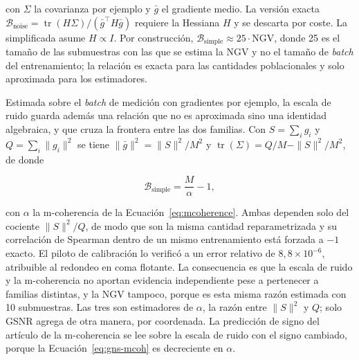 con $\Sigma$ la covarianza por ejemplo y $\bar{g}$ el gradiente medio. La versión exacta $\mathcal{B}_{\text{noise}} = \operatorname{tr}(H\Sigma)/(\bar{g}^\top H \bar{g})$ requiere la Hessiana $H$ y se descarta por coste. La simplificada asume $H \propto I$. Por construcción, $\mathcal{B}_{\text{simple}} \approx 25 \cdot \mathrm{NGV}$, donde 25 es el tamaño de las submuestras con las que se estima la NGV y no el tamaño de \emph{batch} del entrenamiento; la relación es exacta para las cantidades poblacionales y solo aproximada para los estimadores.

Estimada sobre el \emph{batch} de medición con gradientes por ejemplo, la escala de ruido guarda además una relación que no es aproximada sino una identidad algebraica, y que cruza la frontera entre las dos familias. Con $S = \sum_i g_i$ y $Q = \sum_i \|g_i\|^2$ se tiene $\|\bar{g}\|^2 = \|S\|^2/M^2$ y $\operatorname{tr}(\Sigma) = Q/M - \|S\|^2/M^2$, de donde

\begin{equation}
\mathcal{B}_{\text{simple}} = \frac{M}{\alpha} - 1,
\label{eq:gns-mcoh}
\end{equation}

con $\alpha$ la m-coherencia de la Ecuación~\ref{eq:mcoherence}. Ambas dependen solo del cociente $\|S\|^2/Q$, de modo que son la misma cantidad reparametrizada y su correlación de Spearman dentro de un mismo entrenamiento está forzada a $-1$ exacto. El piloto de calibración lo verificó a un error relativo de $8{,}8 \times 10^{-6}$, atribuible al redondeo en coma flotante. La consecuencia es que la escala de ruido y la m-coherencia no aportan evidencia independiente pese a pertenecer a familias distintas, y la NGV tampoco, porque es esta misma razón estimada con 10 submuestras. Las tres son estimadores de $\alpha$, la razón entre $\|S\|^2$ y $Q$; solo GSNR agrega de otra manera, por coordenada. La predicción de signo del artículo de la m-coherencia se lee sobre la escala de ruido con el signo cambiado, porque la Ecuación~\ref{eq:gns-mcoh} es decreciente en $\alpha$.

